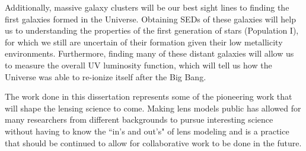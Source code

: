 Additionally, massive galaxy clusters will be our best sight lines to finding the first galaxies formed in the Universe. Obtaining SEDs of these galaxies will help us to understanding the properties of the first generation of stars (Population I), for which we still are uncertain of their formation given their low metallicity environments. Furthermore, finding many of these distant galaxies will allow us to measure the overall UV luminosity function, which will tell us how the Universe was able to re-ionize itself after the Big Bang.

The work done in this dissertation represents some of the pioneering work that will shape the lensing science to come. Making lens models public has allowed for many researchers from different backgrounds to pursue interesting science without having to know the ``in's and out's" of lens modeling and is a practice that should be continued to allow for collaborative work to be done in the future. 


